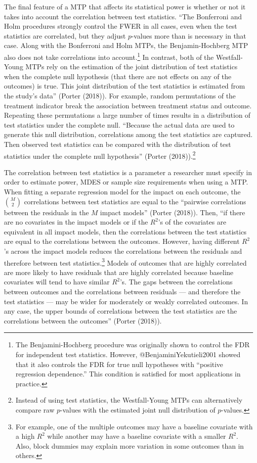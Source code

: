 \documentclass[
]{article}
\begin{document}
The final feature of a MTP that affects its statistical power is whether
or not it takes into account the correlation between test statistics.
``The Bonferroni and Holm procedures strongly control the FWER in all
cases, even when the test statistics are correlated, but they adjust
\(p\)-values more than is necessary in that case. Along with the
Bonferroni and Holm MTPs, the Benjamin-Hochberg MTP also does not take
correlations into
account.\footnote{The Benjamini-Hochberg procedure was originally shown to control the FDR for independent test statistics. However, @BenjaminiYekutieli2001 showed that it also controls the FDR for true null hypotheses with “positive regression dependence.” This condition is satisfied
for most applications in practice.} In contrast, both of the
Westfall-Young MTPs rely on the estimation of the joint distribution of
test statistics when the complete null hypothesis (that there are not
effects on any of the outcomes) is true. This joint distribution of the
test statistics is estimated from the study's data'' (Porter (2018)).
For example, random permutations of the treatment indicator break the
association between treatment status and outcome. Repeating these
permutations a large number of times results in a distribution of test
statistics under the complete null. ``Because the actual data are used
to generate this null distribution, correlations among the test
statistics are captured. Then observed test statistics can be compared
with the distribution of test statistics under the complete null
hypothesis'' (Porter
(2018)).\footnote{Instead of using test statistics, the Westfall-Young MTPs can alternatively compare raw $p$-values with the estimated joint null distribution of $p$-values.}

The correlation between test statistics is a parameter a researcher must
specify in order to estimate power, MDES or sample size requirements
when using a MTP. When fitting a separate regression model for the
impact on each outcome, the \(\binom{M}{2}\) correlations between test
statistics are equal to the ``pairwise correlations between the
residuals in the \(M\) impact models'' (Porter (2018)). Then, ``if there
are no covariates in the impact models or if the \(R^2\)'s of the
covariates are equivalent in all impact models, then the correlations
between the test statistics are equal to the correlations between the
outcomes. However, having different \(R^2\)'s across the impact models
reduces the correlations between the residuals and therefore between
test
statistics.\footnote{For example, one of the multiple outcomes may have a baseline covariate with a high $R^2$ while another may have a baseline covariate with
a smaller $R^2$. Also, block dummies may explain more variation in some outcomes than in others.}
Models of outcomes that are highly correlated are more likely to have
residuals that are highly correlated because baseline covariates will
tend to have similar \(R^2\)'s. The gaps between the correlations
between outcomes and the correlations between residuals --- and
therefore the test statistics --- may be wider for moderately or weakly
correlated outcomes. In any case, the upper bounds of correlations
between the test statistics are the correlations between the outcomes''
(Porter (2018)).
\end{document}
